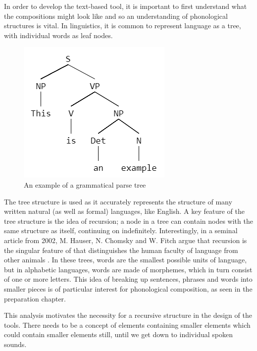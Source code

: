 \documentclass[12pt,a4paper,twoside,openright]{report}
\begin{document}
In order to develop the text-based tool, it is important to first understand what the compositions might look like and so an understanding of phonological structures is vital. In linguistics, it is common to represent language as a tree, with individual words as leaf nodes. 
\begin{figure}[h]
    \centering
    \includegraphics[scale=0.5]{images/parse_tree.png}
    \caption{An example of a grammatical parse tree}
    \label{fig:parse_tree}
\end{figure}

The tree structure is used as it accurately represents the structure of many written natural (as well as formal) languages, like English. A key feature of the tree structure is the idea of recursion; a node in a tree can contain nodes with the same structure as itself, continuing on indefinitely. Interestingly, in a seminal article from 2002, M. Hauser, N. Chomsky and W. Fitch argue that recursion is the singular feature of that distinguishes the human faculty of language from other animals \cite{Hauser02}. In these trees, words are the smallest possible units of language, but in alphabetic languages, words are made of morphemes, which in turn consist of one or more letters. This idea of breaking up sentences, phrases and words into smaller pieces is of particular interest for phonological composition, as seen in the preparation chapter.

This analysis motivates the necessity for a recursive structure in the design of the tools. There needs to be a concept of elements containing smaller elements which could contain smaller elements still, until we get down to individual spoken sounds.
\end{document}
